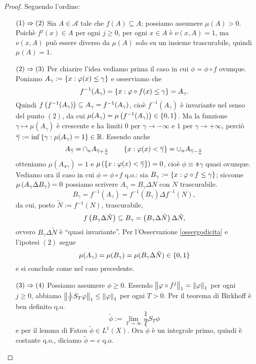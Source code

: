 \begin{proof} Seguendo l'ordine:\begin{itemize}
    \item[$(1)\Rightarrow(2)$] Sia $A\in\mathcal{A}$ tale che $f(A)\subseteq A$; possiamo assumere $\mu(A)>0$. Poichè $f^j(x)\in A$ per ogni $j\ge 0$, per ogni $x\in A$
	    è $\nu(x,A)=1$, ma $\nu(x,A)$ può essere diverso da $\mu(A)$ solo su un insieme trascurabile, quindi $\mu(A)=1$.
    \item[$(2)\Rightarrow(3)$] Per chiarire l'idea vediamo prima il caso in cui $\phi=\phi\circ f$ ovunque.
	    Poniamo $A_\gamma:=\left\{x:\varphi(x)\le\gamma\right\}$ e osserviamo che
	    \[ f^{-1}(A_\gamma)=\left\{x:\varphi\circ f(x)\le\gamma\right\}=A_\gamma. \]
	    Quindi $f\left(f^{-1}(A_\gamma)\right)\subseteq A_\gamma=f^{-1}(A_\gamma)$, cioè $f^{-1}(A_\gamma)$ è invariante nel senso del punto $(2)$,
	    da cui $\mu(A_\gamma)=\mu\left(f^{-1}(A_\gamma)\right)\in\left\{0,1\right\}$.
	    Ma la funzione $\gamma\mapsto\mu(A_\gamma)$ è crescente e ha limiti $0$ per $\gamma\to -\infty$ e $1$ per $\gamma\to +\infty$,
	    perciò $\overline{\gamma}:=\inf\left\{\gamma:\mu(A_\gamma)=1\right\}\in\mathbb{R}$. Essendo anche 
	    \[A_{\overline{\gamma}}=\cap_n A_{\overline{\gamma}+\frac{1}{n}} \qquad \left\{x:\varphi(x)<\overline{\gamma}\right\}=\cup_n A_{\overline{\gamma}-\frac{1}{n}}\]
	    otteniamo $\mu(A_{\obar{\gamma}})=1$
	    e $\mu\left(\left\{x:\varphi(x)<\overline{\gamma}\right\}\right)=0$, cioè $\phi\equiv\obar{\gamma}$ quasi ovunque. 
	    Vediamo ora il caso in cui $\phi=\phi\circ f$ q.o.: sia $B_\gamma:=\left\{x:\varphi\circ f\le\gamma\right\}$;
	    siccome $\mu\left(A_\gamma\Delta B_\gamma\right)=0$ possiamo scrivere $A_\gamma=B_\gamma\Delta N$ con $N$ trascurabile.
	    \[B_\gamma=f^{-1}(A_\gamma)=f^{-1}(B_\gamma)\Delta f^{-1}(N),\]
	    da cui, posto $\tilde{N}:=f^{-1}(N)$, trascurabile,
	    \[f\left(B_\gamma\Delta\tilde{N}\right)\subseteq B_\gamma=\left(B_\gamma\Delta\tilde{N}\right)\Delta\tilde{N},\]
	    ovvero $B_\gamma\Delta\tilde{N}$ è ``quasi invariante''. Per l'Osservazione \ref{ossergodicita} e l'ipotesi $(2)$ segue
	    \[\mu(A_\gamma)=\mu(B_\gamma)=\mu(B_\gamma\Delta\tilde{N})\in\left\{0,1\right\}\]
	    e si conclude come nel caso precedente.
    \item[$(3)\Rightarrow (4)$] Possiamo assumere $\phi\ge 0$.
	    Essendo $\left\|\varphi\circ f^j\right\|_1=\left\|\varphi\right\|_1$ per ogni $j\ge 0$, abbiamo $\left\|\frac{1}{T}S_T\varphi\right\|_1\le \left\|\varphi\right\|_1$ per ogni $T>0$.
	    Per il teorema di Birkhoff è ben definito q.o. 
	    \[\tilde{\phi}:=\lim_{T\to\infty}\frac{1}{T}S_T\phi\]
	    e per il lemma di Fatou $\tilde{\phi}\in L^1(X)$. Ora $\tilde{\phi}$ è un integrale primo, quindi è costante q.o., diciamo $\tilde{\phi}=c$ q.o. 

\end{itemize}
\end{proof}
